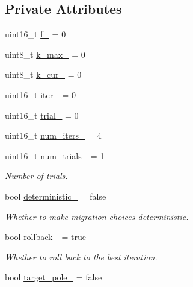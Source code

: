 \subsection*{Private Attributes}
\begin{DoxyCompactItemize}
\item 
uint16\+\_\+t \hyperlink{structvt_1_1vrt_1_1collection_1_1lb_1_1_tempered_l_b_a48a5f74cbfd5eef7e89388f43873dc67}{f\+\_\+} = 0
\item 
uint8\+\_\+t \hyperlink{structvt_1_1vrt_1_1collection_1_1lb_1_1_tempered_l_b_a93df8cbae9252e55004f8337a0fa38da}{k\+\_\+max\+\_\+} = 0
\item 
uint8\+\_\+t \hyperlink{structvt_1_1vrt_1_1collection_1_1lb_1_1_tempered_l_b_aa347fd555156935192b947af57c0dfc9}{k\+\_\+cur\+\_\+} = 0
\item 
uint16\+\_\+t \hyperlink{structvt_1_1vrt_1_1collection_1_1lb_1_1_tempered_l_b_a3b77f5409f6075f12cc21e32d3b70cec}{iter\+\_\+} = 0
\item 
uint16\+\_\+t \hyperlink{structvt_1_1vrt_1_1collection_1_1lb_1_1_tempered_l_b_a59a375e446dafe37a14aa784cea0af2b}{trial\+\_\+} = 0
\item 
uint16\+\_\+t \hyperlink{structvt_1_1vrt_1_1collection_1_1lb_1_1_tempered_l_b_a7fb754a3c6f3a5ecfb731630da7c50cf}{num\+\_\+iters\+\_\+} = 4
\item 
uint16\+\_\+t \hyperlink{structvt_1_1vrt_1_1collection_1_1lb_1_1_tempered_l_b_ae72c8ffda32aab7bc7c1a6e7a0f68030}{num\+\_\+trials\+\_\+} = 1
\begin{DoxyCompactList}\small\item\em Number of trials. \end{DoxyCompactList}\item 
bool \hyperlink{structvt_1_1vrt_1_1collection_1_1lb_1_1_tempered_l_b_af99c4265a75445513e2aff865d65ba9e}{deterministic\+\_\+} = false
\begin{DoxyCompactList}\small\item\em Whether to make migration choices deterministic. \end{DoxyCompactList}\item 
bool \hyperlink{structvt_1_1vrt_1_1collection_1_1lb_1_1_tempered_l_b_a8900853d75cdd5fa37add8b611f1fbc4}{rollback\+\_\+} = true
\begin{DoxyCompactList}\small\item\em Whether to roll back to the best iteration. \end{DoxyCompactList}\item 
bool \hyperlink{structvt_1_1vrt_1_1collection_1_1lb_1_1_tempered_l_b_aa935bb67c93d782cca48524144039deb}{target\+\_\+pole\+\_\+} = false

\end{DoxyCompactItemize}
